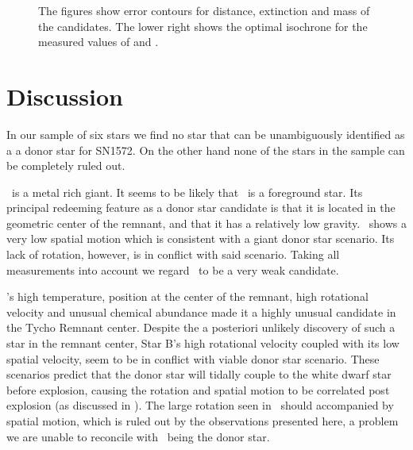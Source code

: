 \begin{figure}[htbp]
   \caption[Distance, extinction and mass measurements in ]{The figures show error contours for distance, extinction and mass of the candidates. The lower right shows the optimal isochrone \citep{2004ApJ...612..168P}  for the measured values of  and . }
   \label{fig:mc_isochrone}
\end{figure}



\section{Discussion}
\label{sec:sn1572_hires:discussion}

In our sample of six stars we find no star that can be unambiguously identified as a a donor star for SN1572. On the other hand none of the stars in the sample can be completely ruled out. 

\stara\ is a metal rich giant. It seems to be likely that \stara\ is a foreground star. Its principal redeeming feature as a donor star candidate is that it is located in the geometric center of the remnant, and that it has a relatively low gravity. \stara\ shows a very low spatial motion which is consistent with a giant donor star scenario. Its lack of rotation, however, is in conflict with said scenario. 
Taking all measurements into account we regard \stara\ to be a very weak candidate.

\starb's  high temperature, position at the center of the remnant, high rotational velocity and unusual chemical abundance made it a highly unusual candidate in the Tycho Remnant center. Despite the a posteriori unlikely discovery of such a star in the remnant center, Star B's high rotational velocity coupled with its low spatial velocity, seem to be in conflict with viable donor star scenario. 
These scenarios predict that the donor star will tidally couple to the white dwarf star before explosion, causing the rotation and spatial motion to be correlated post explosion (as discussed in \wek). The large rotation seen in \starb\ should accompanied by spatial motion, which is ruled out by the observations presented here, a problem we are unable to reconcile with \starb\ being the donor star. 

